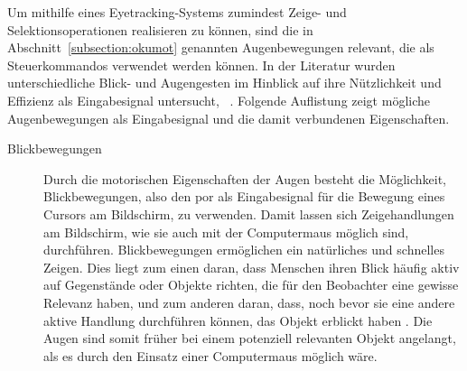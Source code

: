 Um mithilfe eines Eyetracking-Systems zumindest Zeige- und Selektionsoperationen realisieren zu können, sind die in Abschnitt~\ref{subsection:okumot} genannten Augenbewegungen relevant, die als Steuerkommandos verwendet werden können. In der Literatur wurden unterschiedliche Blick- und Augengesten im Hinblick auf ihre Nützlichkeit und Effizienz als Eingabesignal untersucht, \vgl~\cite{Hollomon2017,Eidam2015,Poole2005}. Folgende Auflistung zeigt mögliche Augenbewegungen als Eingabesignal und die damit verbundenen Eigenschaften. 

\begin{description}
\item[Blickbewegungen] Durch die motorischen Eigenschaften der Augen besteht die Möglichkeit, Blickbewegungen, also den \acs{por} als Eingabesignal für die Bewegung eines Cursors am Bildschirm, zu verwenden. Damit lassen sich Zeigehandlungen am Bildschirm, wie sie auch mit der Computermaus möglich sind, durchführen. Blickbewegungen ermöglichen ein natürliches und schnelles Zeigen. Dies liegt zum einen daran, dass Menschen ihren Blick häufig aktiv auf Gegenstände oder Objekte richten, die für den Beobachter eine gewisse Relevanz haben, und zum anderen daran, dass, noch bevor sie eine andere aktive Handlung durchführen können, das Objekt erblickt haben \cite{majaranta2011}. Die Augen sind somit früher bei einem potenziell relevanten Objekt angelangt, als es durch den Einsatz einer Computermaus möglich wäre. 


\end{description}
